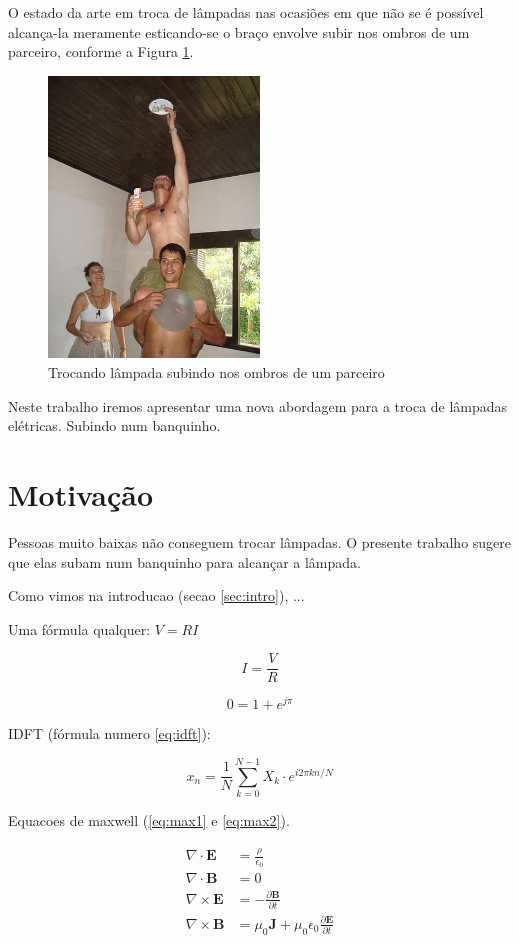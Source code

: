 \documentclass{article}
\newcommand{\vetor}[1]{\textbf{#1}}
\begin{document}
O estado da arte em troca de lâmpadas nas ocasiões em que não se é possível
alcança-la meramente esticando-se o braço envolve subir nos ombros de um parceiro,
conforme a Figura \ref{fig:ombros}.

\begin{figure}[!htb]
  \centering
  \includegraphics[width=0.5\textwidth]{ombros.jpg}
  \caption{Trocando lâmpada subindo nos ombros de um parceiro}
  \label{fig:ombros}
\end{figure}


Neste trabalho iremos apresentar uma nova abordagem
para a troca de lâmpadas elétricas.
Subindo num banquinho. %


\section{Motivação}
\label{sec:motiv}

Pessoas muito baixas não conseguem trocar lâmpadas.
O presente trabalho sugere que elas subam num
banquinho para alcançar a lâmpada.

\hfill

Como vimos na introducao (secao \ref{sec:intro}),
...

Uma fórmula qualquer: $V=R I$

$$I = \frac{V}{R}$$

$$0=1+e^{j\pi}$$

IDFT (fórmula numero \ref{eq:idft}):

\begin{equation}
\label{eq:idft}
x_n = \frac{1}{N}
\sum_{k=0}^{N-1} X_k \cdot
e^{i2\pi kn/N}
\end{equation}

Equacoes de maxwell (\ref{eq:max1} e \ref{eq:max2}).

\begin{align}
\label{eq:max1}
\nabla \cdot \vetor{E} & = \frac{\rho}{\epsilon_0} \\
\label{eq:max2}
\nabla \cdot \vetor{B} & = 0 \\
\nabla \times \vetor{E}
& = - \frac{\partial \vetor{B}}{\partial t} \\
\nabla \times \vetor{B} & =
\mu_0\vetor{J} + \mu_0 \epsilon_0
\frac{\partial \vetor{E}}{\partial t}
\end{align}
\end{document}
